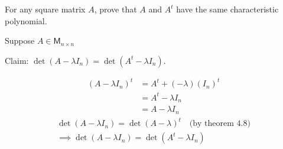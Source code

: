 For any square matrix $A$, prove that $A$ and $A^t$ have the same
characteristic polynomial.

Suppose $A \in \mathsf{M}_{n\times n}$

Claim: $\det{(A-\lambda I_n)} = \det{(A^t-\lambda I_n)}$.

\begin{align}
(A-\lambda I_n)^t &= A^t + (-\lambda)(I_n)^t\\
&= A^t -\lambda I_n\\
&= A -\lambda I_n
\end{align}
\begin{gather}
\det{(A-\lambda I_n)} = \det{(A-\lambda)^t} \quad \text{(by theorem
  4.8)}\\
\implies \det{(A-\lambda I_n)} = \det{(A^t-\lambda I_n)}
\end{gather}
